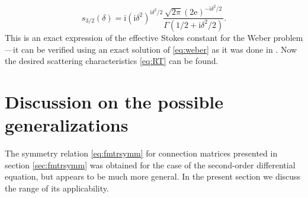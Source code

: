 \documentclass[atmp]{ipart_v1}
\def\rme{\mathrm{e}}
\def\rmi{\mathrm{i}}
\newcommand\eref[1]{\eqref{#1}}
\newcommand\sref[1]{section \ref{#1}}
\begin{document}
\begin{equation}
s_{3/2}(\delta)=\rmi(\rmi\delta^2)^{\rmi\delta^2/2}
\frac{\sqrt{2\pi}(2\rme)^{-\rmi\delta^2/2}}{\Gamma(1/2+\rmi\delta^2/2)}.
\label{eq:s3/2}
\end{equation}
This is an exact expression of the effective Stokes constant for 
the Weber problem---it can be verified using 
an exact solution of \eref{eq:weber} as it was done in \cite{ours}. 
Now the desired scattering characteristics \eref{eq:RT} can be found.













\section{Discussion on the possible generalizations \label{sec:discuss}}

The symmetry relation \eref{eq:fmtrsymm} for connection matrices presented in \sref{sec:fmtrsymm} 
was obtained for the case of the second-order differential equation, but appears to be much more general. 
In the present section we discuss the range of its applicability.
\end{document}
